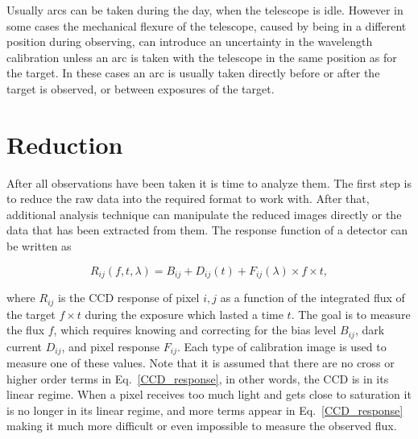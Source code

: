\documentclass[a4paper,oneside,12pt, class=Latex/Classes/PhDthesisPSnPDF, crop=false]{standalone}
\begin{document}
Usually arcs can be taken during the day, when the telescope is idle. However in some cases the mechanical flexure of the telescope, caused by being in a different position during observing, can introduce an uncertainty in the wavelength calibration unless an arc is taken with the telescope in the same position as for the target. In these cases an arc is usually taken directly before or after the target is observed, or between exposures of the target.


\section{Reduction}
\label{reduction}
After all observations have been taken it is time to analyze them. The first step is to reduce the raw data into the required format to work with. After that, additional analysis technique can manipulate the reduced images directly or the data that has been extracted from them. The response function of a detector can be written as

\begin{equation}
	R_{ij}(f, t, \lambda) = B_{ij} + D_{ij}(t) + F_{ij}(\lambda) \times f \times t,
	\label{CCD_response}
\end{equation}

where $R_{ij}$ is the CCD response of pixel $i,j$ as a function of the integrated flux of the target $f \times t$ during the exposure which lasted a time $t$. The goal is to measure the flux $f$, which requires knowing and correcting for the bias level $B_{ij}$, dark current $D_{ij}$, and pixel response $F_{ij}$. Each type of calibration image is used to measure one of these values. Note that it is assumed that there are no cross or higher order terms in Eq.~\ref{CCD_response}, in other words, the CCD is in its linear regime. When a pixel receives too much light and gets close to saturation it is no longer in its linear regime, and more terms appear in Eq.~\ref{CCD_response} making it much more difficult or even impossible to measure the observed flux.
\end{document}
